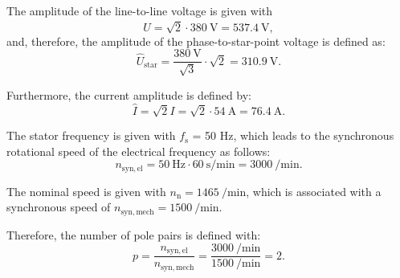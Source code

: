 
\begin{solutionblock}
    The amplitude of the line-to-line voltage is given with
    \begin{equation}
    \hat{U} = \sqrt{2}\cdot \SI{380}{\volt}
    = \SI{537.4}{\volt},
    \end{equation}
    and, therefore, the amplitude of the phase-to-star-point voltage is defined as:
    \begin{equation}
    \hat{U}_{\mathrm{star}} = \frac{\SI{380}{\volt}}{\sqrt{3}}\cdot \sqrt{2} = \SI{310.9}{\volt}.
    \end{equation}

    Furthermore, the current amplitude is defined by:
    \begin{equation}
        \hat{I} = \sqrt{2} I = \sqrt{2} \cdot \SI{54}{\ampere} = \SI{76.4}{\ampere}.
    \end{equation}
\end{solutionblock}


\begin{solutionblock}
    The stator frequency is given with $f_{\mathrm{s}}$ = 50 Hz, which leads to the synchronous rotational speed of the electrical frequency as follows:
    \begin{equation}
        n_{\mathrm{syn,el}} = \SI{50}{\hertz} \cdot \SI{60}{\second\per\minute}
        = \SI{3000}{\per\minute}.
    \end{equation}
    
    The nominal speed is given with $n_{\mathrm{n}} = \SI{1465}{\per\minute}$, which is associated with a synchronous speed of $n_{\mathrm{syn,mech}} = \SI{1500}{\per\minute}$.
    
    Therefore, the number of pole pairs is defined with:
    \begin{equation}
        p = \frac{n_{\mathrm{syn,el}}}{n_{\mathrm{syn,mech}}}
        = \frac{\SI{3000}{\per\minute}}{\SI{1500}{\per\minute}}
        = 2.
    \end{equation}

\end{solutionblock}


